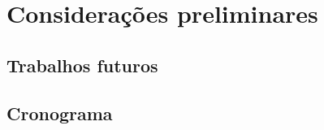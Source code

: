 \chapter{Considerações preliminares}
\label{cap-conclusoes}

\section{Trabalhos futuros}

\section{Cronograma}
%
